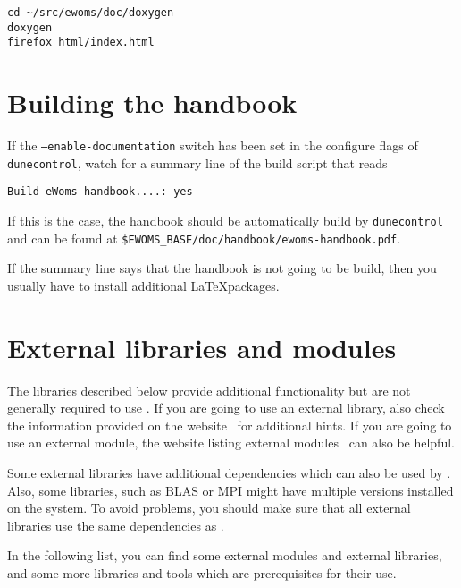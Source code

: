 \begin{lstlisting}[style=Bash]
cd ~/src/ewoms/doc/doxygen
doxygen
firefox html/index.html
\end{lstlisting}

\section{Building the \eWoms handbook}

If the \texttt{--enable-documentation} switch has been set in the configure flags of
\texttt{dunecontrol}, watch for a summary line of the build script that reads
\begin{lstlisting}[style=Bash]
Build eWoms handbook....: yes
\end{lstlisting}

If this is the case, the handbook should be automatically build by
\texttt{dunecontrol} and can be found at
\texttt{\$EWOMS\_BASE/doc/handbook/ewoms-handbook.pdf}.

If the summary line says that the handbook is not going to be build,
then you usually have to install additional \LaTeX packages.

\section{External libraries and modules}
\label{sec:external-modules-libraries}

The libraries described below provide additional functionality but are
not generally required to use \eWoms.  If you are going to use an
external library, also check the information provided on the \Dune
website~\cite{DUNE-EXT-LIB} for additional hints.  If you are going to
use an external \Dune module, the website listing external
modules~\cite{DUNE-EXT-MOD} can also be helpful.

Some external libraries have additional dependencies which can also be
used by \Dune.  Also, some libraries, such as BLAS or MPI might have
multiple versions installed on the system.  To avoid problems, you
should make sure that all external libraries use the same dependencies
as \Dune.

In the following list, you can find some external modules and external
libraries, and some more libraries and tools which are prerequisites
for their use.

